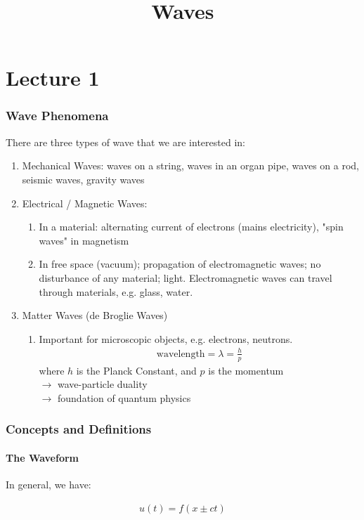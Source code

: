 \documentclass[10pt,a4paper]{article}
\title{Waves}
\begin{document}
\part*{Lecture 1}

\section*{Wave Phenomena}

There are three types of wave that we are interested in:

\begin{enumerate}
\item Mechanical Waves: waves on a string, waves in an organ pipe, waves on a rod, seismic waves, gravity waves
\item Electrical / Magnetic Waves:
\begin{enumerate}
\item In a material: alternating current of electrons (mains electricity), "spin waves" in magnetism
\item In free space (vacuum); propagation of electromagnetic waves; no disturbance of any material; light. Electromagnetic waves can travel through materials, e.g. glass, water.
\end{enumerate}
\item Matter Waves (de Broglie Waves)
\begin{enumerate}
\item Important for microscopic objects, e.g. electrons, neutrons.
\begin{align*}
\text{wavelength} = \lambda = \frac{h}{p}
\end{align*}
where $h$ is the Planck Constant, and $p$ is the momentum \\
$\rightarrow$ wave-particle duality \\
$\rightarrow$ foundation of quantum physics
\end{enumerate}
\end{enumerate}

\section*{Concepts and Definitions}

\subsection*{The Waveform}

In general, we have:

\begin{align*}
u(t) = f(x \pm ct)
\end{align*}
\end{document}
